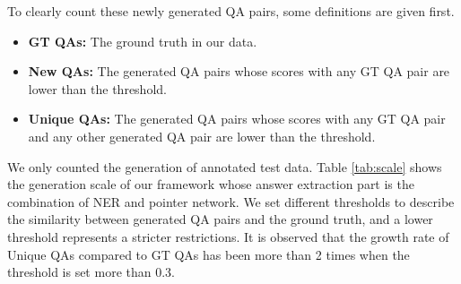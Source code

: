 To clearly count these newly generated QA pairs, some definitions are given first.
\begin{itemize}
\item \textbf{GT QAs:} The ground truth in our data.
\item \textbf{New QAs:} The generated QA pairs whose scores with any GT QA pair are lower than the threshold.
\item \textbf{Unique QAs:}  The generated QA pairs whose scores with any GT QA pair and any other generated QA pair are lower than the threshold.
\end{itemize}

We only counted the generation of annotated test data.
Table \ref{tab:scale} shows the generation scale of our framework whose answer extraction part is the combination of NER and pointer network.
We set different thresholds to describe the similarity between generated QA pairs and the ground truth, and a lower threshold represents a stricter restrictions.
It is observed that the growth rate of Unique QAs compared to GT QAs has been more than 2 times when the threshold is set more than 0.3.

